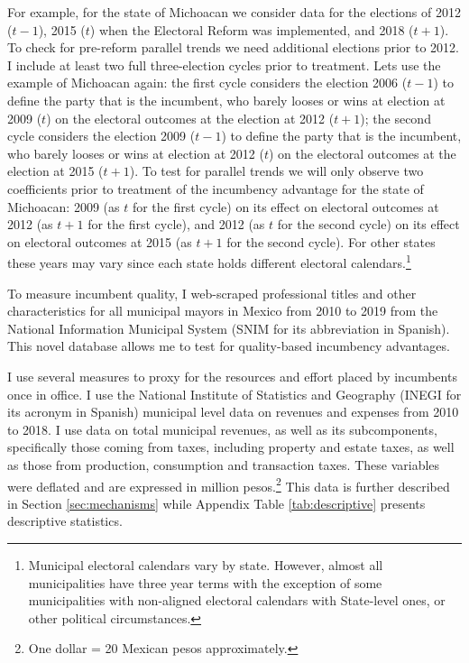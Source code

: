 For example, for the state of Michoacan we consider data for the elections of 2012 ($t-1$), 2015 ($t$) when the Electoral Reform was implemented, and 2018 ($t+1$). To check for pre-reform parallel trends we need additional elections prior to 2012. I include at least two full three-election cycles prior to treatment. Lets use the example of Michoacan again: the first cycle considers the election 2006 ($t-1$) to define the party that is the incumbent, who barely looses or wins at election at 2009 ($t$) on the electoral outcomes at the election at 2012 ($t+1$); the second cycle considers the election 2009 ($t-1$) to define the party that is the incumbent, who barely looses or wins at election at 2012 ($t$) on the electoral outcomes at the election at 2015 ($t+1$). To test for parallel trends we will only observe two coefficients prior to treatment of the incumbency advantage for the state of Michoacan: 2009 (as $t$ for the first cycle) on its effect on electoral outcomes at 2012 (as $t+1$ for the first cycle), and 2012 (as $t$ for the second cycle) on its effect on electoral outcomes at 2015 (as $t+1$ for the second cycle).   For other states these years may vary since each state holds different electoral calendars.\footnote{Municipal electoral calendars vary by state. However, almost all municipalities have three year terms with the exception of some municipalities with non-aligned electoral calendars with State-level ones, or other political circumstances.}


To measure incumbent quality, I web-scraped professional titles and other characteristics for all municipal mayors in Mexico from 2010 to 2019 from the National Information Municipal System (SNIM for its abbreviation in Spanish). This novel database allows me to test for quality-based incumbency advantages.

I use several measures to proxy for the resources and effort placed by incumbents once in office. I use the National Institute of Statistics and Geography (INEGI for its acronym in Spanish) municipal level data on revenues and expenses from 2010 to 2018. I use data on total municipal revenues, as well as its subcomponents, specifically those coming from taxes, including property and estate taxes, as well as those from production, consumption and transaction taxes. These variables were deflated and are expressed in million pesos.\footnote{One dollar = 20 Mexican pesos approximately.} This data is further described in Section \ref{sec:mechanisms} while Appendix Table \ref{tab:descriptive} presents descriptive statistics.
  
